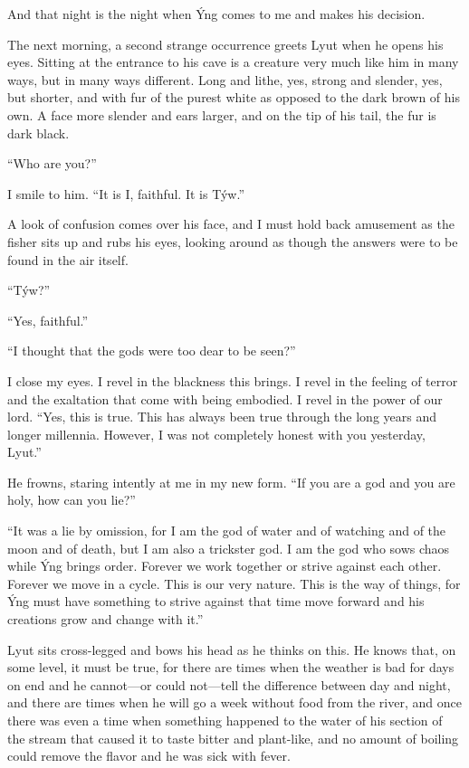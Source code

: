And that night is the night when Ýng comes to me and makes his decision.

The next morning, a second strange occurrence greets Lyut when he opens his eyes. Sitting at the entrance to his cave is a creature very much like him in many ways, but in many ways different. Long and lithe, yes, strong and slender, yes, but shorter, and with fur of the purest white as opposed to the dark brown of his own. A face more slender and ears larger, and on the tip of his tail, the fur is dark black.

``Who are you?''

I smile to him. ``It is I, faithful. It is Týw.''

A look of confusion comes over his face, and I must hold back amusement as the fisher sits up and rubs his eyes, looking around as though the answers were to be found in the air itself.

``Týw?''

``Yes, faithful.''

``I thought that the gods were too dear to be seen?''

I close my eyes. I revel in the blackness this brings. I revel in the feeling of terror and the exaltation that come with being embodied. I revel in the power of our lord. ``Yes, this is true. This has always been true through the long years and longer millennia. However, I was not completely honest with you yesterday, Lyut.''

He frowns, staring intently at me in my new form. ``If you are a god and you are holy, how can you lie?''

``It was a lie by omission, for I am the god of water and of watching and of the moon and of death, but I am also a trickster god. I am the god who sows chaos while Ýng brings order. Forever we work together or strive against each other. Forever we move in a cycle. This is our very nature. This is the way of things, for Ýng must have something to strive against that time move forward and his creations grow and change with it.''

Lyut sits cross-legged and bows his head as he thinks on this. He knows that, on some level, it must be true, for there are times when the weather is bad for days on end and he cannot---or could not---tell the difference between day and night, and there are times when he will go a week without food from the river, and once there was even a time when something happened to the water of his section of the stream that caused it to taste bitter and plant-like, and no amount of boiling could remove the flavor and he was sick with fever.

